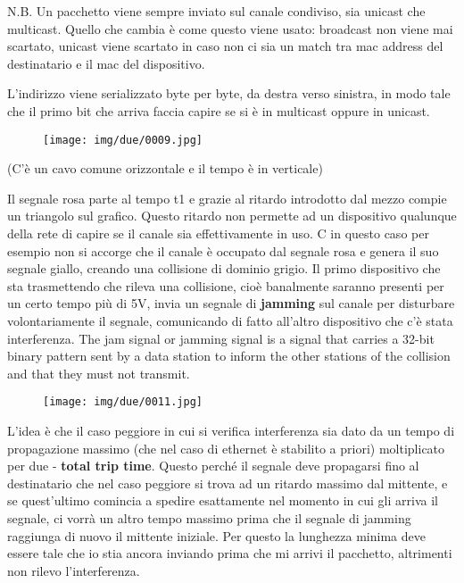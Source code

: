 \documentclass{article}
\begin{document}
\noindent N.B. Un pacchetto viene sempre inviato sul canale condiviso, sia unicast che multicast.
Quello che cambia è come questo viene usato: broadcast non viene mai scartato, unicast viene scartato in caso non ci sia un match 
tra mac address del destinatario e il mac del dispositivo.
\medskip

\noindent L'indirizzo viene serializzato byte per byte, da destra verso sinistra, in modo tale che il primo bit che arriva faccia capire 
se si è in multicast oppure in unicast.

\begin{figure}[!ht]
    \begin{center}
        \texttt{[image: img/due/0009.jpg]}         
    \end{center}
\end{figure}

\noindent (C'è un cavo comune orizzontale e il tempo è in verticale)

\noindent Il segnale rosa parte al tempo t1 e grazie al ritardo introdotto dal mezzo compie un triangolo sul grafico. Questo ritardo non permette
ad un dispositivo qualunque della rete di capire se il canale sia effettivamente in uso. C in questo caso per esempio non si accorge 
che il canale è occupato dal segnale rosa e genera il suo segnale giallo, creando una collisione di dominio grigio.
Il primo dispositivo che sta trasmettendo che rileva una collisione, cioè banalmente saranno presenti per un certo tempo più di 5V, invia un segnale
di \textbf{jamming} sul canale per disturbare volontariamente il segnale, comunicando di fatto all'altro dispositivo che c'è stata
interferenza.
The jam signal or jamming signal is a signal that carries a 32-bit binary pattern sent by a data station to inform the other 
stations of the collision and that they must not transmit.
\pagebreak

\begin{figure}[!ht]
    \begin{center}
        \texttt{[image: img/due/0011.jpg]}         
    \end{center}
\end{figure}

\noindent L'idea è che il caso peggiore in cui si verifica interferenza sia dato da un tempo di propagazione massimo (che nel caso di
ethernet è stabilito a priori) moltiplicato per due - \textbf{total trip time}. Questo perché il segnale deve propagarsi fino al 
destinatario che nel caso peggiore si trova ad un ritardo massimo dal mittente, e se quest'ultimo comincia a spedire esattamente
 nel momento in cui gli arriva il segnale, ci vorrà un altro tempo massimo prima che il segnale di jamming raggiunga di nuovo il 
 mittente iniziale. Per questo la lunghezza minima deve essere tale che io stia ancora inviando prima che mi arrivi il pacchetto, 
 altrimenti non rilevo l'interferenza.
\end{document}
